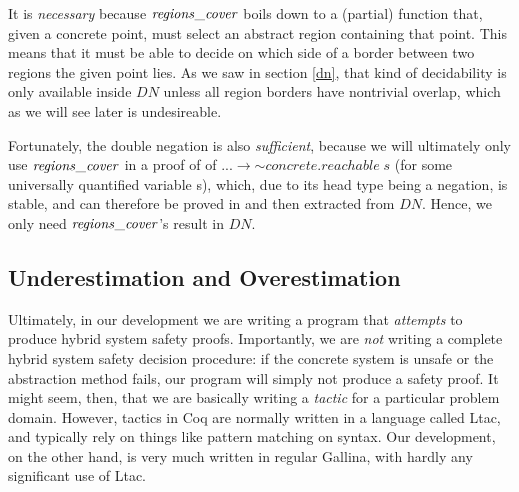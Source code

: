 \documentclass[runningheads]{llncs}
\newcommand{\Conid}[1]{\mathit{#1}}
\newcommand{\Varid}[1]{\mathit{#1}}
\begin{document}
It is \emph{necessary} because \ensuremath{\Varid{regions\char95 cover}} boils down to a
(partial) function that, given a concrete point, must select an
abstract region containing that point. This means that it must be able
to decide on which side of a border between two regions the given
point lies. As we saw in section \ref{dn}, that kind of decidability
is only available inside \ensuremath{\Conid{DN}} unless all region borders have
nontrivial overlap, which as we will see later is undesireable.

Fortunately, the double negation is also \emph{sufficient}, because we
will ultimately only use \ensuremath{\Varid{regions\char95 cover}} in a proof of of \ensuremath{\mathbin{...}\to \mathord{\sim}\Varid{concrete}.\Varid{reachable}\;\Varid{s}} (for some universally quantified variable s),
which, due to its head type being a negation, is stable, and can
therefore be proved in and then extracted from \ensuremath{\Conid{DN}}. Hence, we only
need \ensuremath{\Varid{regions\char95 cover}}'s result in \ensuremath{\Conid{DN}}.

\subsection{Underestimation and Overestimation}
\label{estimation}

Ultimately, in our development we are writing a program that
\emph{attempts} to produce hybrid system safety proofs. Importantly,
we are \emph{not} writing a complete hybrid system safety decision
procedure: if the concrete system is unsafe or the abstraction method
fails, our program will simply not produce a safety proof. It might
seem, then, that we are basically writing a \emph{tactic} for a
particular problem domain. However, tactics in Coq are normally
written in a language called Ltac, and typically rely on things like
pattern matching on syntax. Our development, on the other hand, is
very much written in regular Gallina, with hardly any significant use
of Ltac. 
\end{document}
